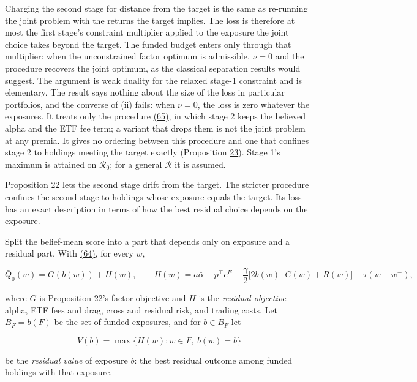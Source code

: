 \documentclass[11pt]{article}
\begin{document}
Charging the second stage for distance from the target is the same
as re-running the joint problem with the returns the target
implies. The loss is therefore at most the first stage's constraint
multiplier applied to the exposure the joint choice takes beyond
the target. The funded budget enters only through that multiplier:
when the unconstrained factor optimum is admissible, \(\nu=0\) and
the procedure recovers the joint optimum, as the classical
separation results would suggest. The argument is weak duality for
the relaxed stage-1 constraint and is elementary. The result says
nothing about the size of the loss in particular portfolios, and
the converse of (ii) fails: when \(\nu=0\), the loss is zero
whatever the exposures. It treats only the procedure \hyperref[eq:65]{(65)}, in which
stage 2 keeps the believed alpha and the ETF fee term; a variant
that drops them is not the joint problem at any premia. It gives
no ordering between this procedure and one that confines stage 2
to holdings meeting the target exactly (Proposition \hyperref[res:Proposition-23]{23}). Stage 1's
maximum is attained on \(\mathcal R_0\); for a general
\(\mathcal R\) it is assumed.

Proposition \hyperref[res:Proposition-22]{22} lets the second stage drift from the target. The
stricter procedure confines the second stage to holdings whose
exposure equals the target. Its loss has an exact description in
terms of how the best residual choice depends on the exposure.

Split the belief-mean score into a part that depends only on
exposure and a residual part. With \hyperref[eq:64]{(64)}, for every \(w\),

\begin{equation*}
\bar Q_0(w)=G(b(w))+H(w),\qquad
H(w)=a\bar\alpha-p^\top c^E-\frac\gamma2\bigl[2b(w)^\top C(w)+R(w)\bigr]
 -\tau(w-w^-),\tag{68}\label{eq:68}
\end{equation*}

where \(G\) is Proposition \hyperref[res:Proposition-22]{22}'s factor objective and \(H\) is the
\emph{residual objective}: alpha, ETF fees and drag, cross and residual
risk, and trading costs. Let \(B_F=b(F)\) be the set of funded
exposures, and for \(b\in B_F\) let

\begin{equation*}
V(b)=\max\{H(w):w\in F,\ b(w)=b\}\tag{69}\label{eq:69}
\end{equation*}

be the \emph{residual value} of exposure \(b\): the best residual
outcome among funded holdings with that exposure.
\end{document}
